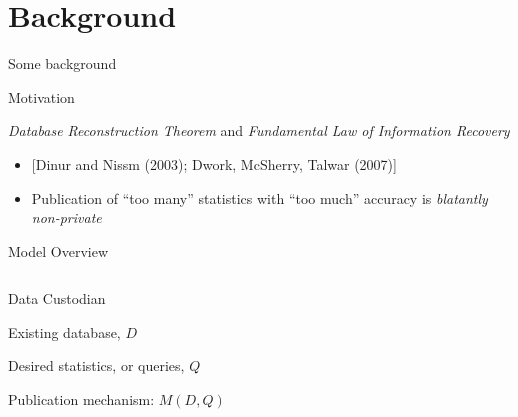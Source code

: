 

\section{Background}
\begin{transitionframe}
  \begin{center}
    \Huge Some background
  \end{center}
\end{transitionframe}


\begin{frame}{Motivation}
  \begin{wideitemize}
    \item \emph{Database Reconstruction Theorem} and \emph{Fundamental Law of Information Recovery}
    \begin{itemize}
    	\item  \footnotesize \color{darkgray} [Dinur and Nissm (2003); Dwork, McSherry, Talwar (2007)] \color{black}\normalsize
    	\item Publication of ``too many'' statistics with ``too much'' accuracy is \emph{blatantly non-private}
    \end{itemize}
  \end{wideitemize}
\end{frame}


\begin{frame}{Model Overview}
\begin{columns}[T] %
\begin{column}{.58\textwidth}
  \begin{wideitemize}
    \item Data Custodian
    \item Existing database, $D$
    \item Desired statistics, or queries, $Q$
    \item Publication mechanism: $M(D,Q)$
  \end{wideitemize}
\end{column}%
\hfill%
\begin{column}{.38\textwidth}
\end{column}%
\end{columns}
\end{frame}

